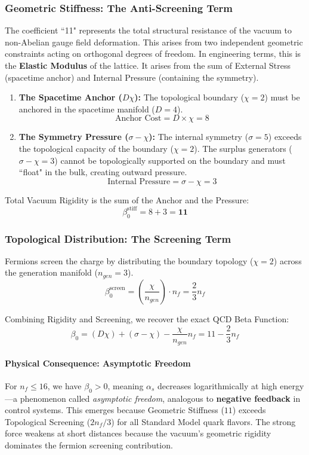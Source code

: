 \subsubsection{Geometric Stiffness: The Anti-Screening Term}
The coefficient ``11" represents the total structural resistance of the vacuum to non-Abelian gauge field deformation. This arises from two independent geometric constraints acting on orthogonal degrees of freedom. In engineering terms, this is the \textbf{Elastic Modulus} of the lattice. It arises from the sum of External Stress (spacetime anchor) and Internal Pressure (containing the symmetry).
\begin{enumerate}
    \item \textbf{The Spacetime Anchor ($D\chi$):} The topological boundary ($\chi=2$) must be anchored in the spacetime manifold ($D=4$).
    \[ \text{Anchor Cost} = D \times \chi = 8 \]
    \item \textbf{The Symmetry Pressure ($\sigma - \chi$):} The internal symmetry ($\sigma=5$) exceeds the topological capacity of the boundary ($\chi=2$). The surplus generators ($\sigma - \chi = 3$) cannot be topologically supported on the boundary and must ``float" in the bulk, creating outward pressure.
   \[ \text{Internal Pressure} = \sigma - \chi = 3 \]
\end{enumerate}
Total Vacuum Rigidity is the sum of the Anchor and the Pressure:
\begin{equation}
    \beta_0^{\text{stiff}} = 8 + 3 = \mathbf{11}
\end{equation}

\subsubsection{Topological Distribution: The Screening Term}
Fermions screen the charge by distributing the boundary topology ($\chi=2$) across the generation manifold ($n_{gen}=3$).
\begin{equation}
    \beta_0^{\text{screen}} = \left( \frac{\chi}{n_{gen}} \right) \cdot n_f = \frac{2}{3} n_f
\end{equation}

Combining Rigidity and Screening, we recover the exact QCD Beta Function:
\begin{equation} \label{eq:beta_qcd}
    \beta_0 = (D\chi) + (\sigma-\chi) - \frac{\chi}{n_{gen}} n_f = 11 - \frac{2}{3}n_f
\end{equation}

\paragraph{Physical Consequence: Asymptotic Freedom}
For $n_f \leq 16$, we have $\beta_0 > 0$, meaning $\alpha_s$ decreases logarithmically at high energy—a phenomenon called \textit{asymptotic freedom}, analogous to \textbf{negative feedback} in control systems. This emerges because Geometric Stiffness ($11$) exceeds Topological Screening ($2n_f/3$) for all Standard Model quark flavors. The strong force weakens at short distances because the vacuum's geometric rigidity dominates the fermion screening contribution.

